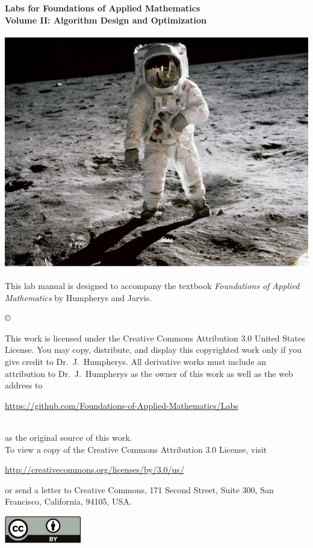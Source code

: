 \documentclass[nociteref]{SIAM-GH-book}
\begin{document}

\thispagestyle{empty} %

\begin{center}
{\huge \bf Labs for Foundations of Applied Mathematics} \\
\vspace{5mm}
{\Large \bf Volume II: Algorithm Design and Optimization}
\vspace{20mm}

\includegraphics[scale=.4]{Cover.pdf}
\end{center}
\frontmatter



\begin{thepreface} %

This lab manual is designed to accompany the textbook \emph{Foundations of Applied Mathematics} by Humpherys and Jarvis.

\vfill
\copyright{This work is licensed under the Creative Commons Attribution 3.0 United States
License.  You may copy, distribute, and display this copyrighted work only if you give
credit to Dr.~J.~Humpherys. All derivative works must include an attribution to Dr.~J.~Humpherys as the owner of this work as well as the web address to
\\\centerline{\url{https://github.com/Foundations-of-Applied-Mathematics/Labs}}\\as the original source of this work.
\\To view a copy of the Creative Commons Attribution 3.0 License, visit
\\\centerline{\url{http://creativecommons.org/licenses/by/3.0/us/}} or send a letter to Creative Commons, 171 Second Street, Suite 300, San Francisco, California, 94105, USA.}

\vfill
\centering\includegraphics[height=1.2cm]{by.pdf}
\vfill
\end{thepreface}
\end{document}
